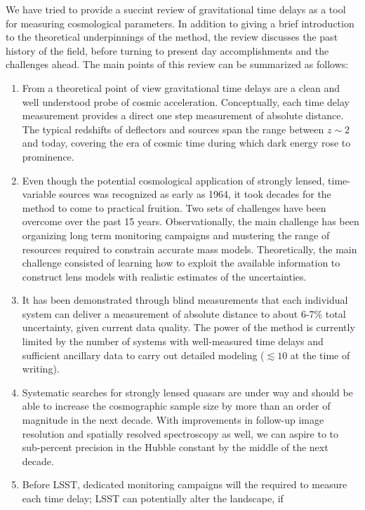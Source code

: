 We have tried to provide a succint review of gravitational time delays as
a tool for measuring cosmological parameters. In addition to giving a
brief introduction to the theoretical underpinnings of the method, the
review discusses the past history of the field, before turning to
present day accomplishments and the challenges ahead. The main points
of this review can be summarized as follows:

\begin{enumerate}
\item From a theoretical point of view gravitational time delays are a
clean and well understood probe of cosmic acceleration. Conceptually,
each time delay measurement provides a direct one step measurement of
absolute distance. The typical redshifts of deflectors and sources span
the range between $z\sim2$ and today, covering the era of cosmic time
during which dark energy rose to prominence.
\item Even though the potential cosmological application of strongly
lensed, time-variable sources was recognized as early as 1964, it took
decades for the method to come to practical fruition. Two sets of
challenges have been overcome over the past 15 years. Observationally, the
main challenge has been organizing long term monitoring campaigns and
mustering the range of resources required to constrain accurate mass
models. Theoretically, the main challenge consisted of learning how to
exploit the available information to construct lens models with
realistic estimates of the uncertainties.
\item It has been demonstrated through blind measurements that each
individual system can deliver a measurement of absolute distance to
about 6-7\% total uncertainty, given current data quality.   The power of
the method is currently limited by the number of systems with
well-measured time delays and sufficient ancillary data to carry out
detailed modeling ($\lesssim10$ at the time of writing).
\item Systematic searches for strongly lensed quasars are under way and
should be able to increase the cosmographic sample size by more than an
order of magnitude in the next decade. With improvements in follow-up image
resolution and spatially resolved spectroscopy as well, we can aspire to
to sub-percent precision in the Hubble constant by the
middle of the next decade.
\item Before LSST, dedicated monitoring campaigns will the required to
measure each time delay; LSST can potentially alter the landscape, if

\end{enumerate}
